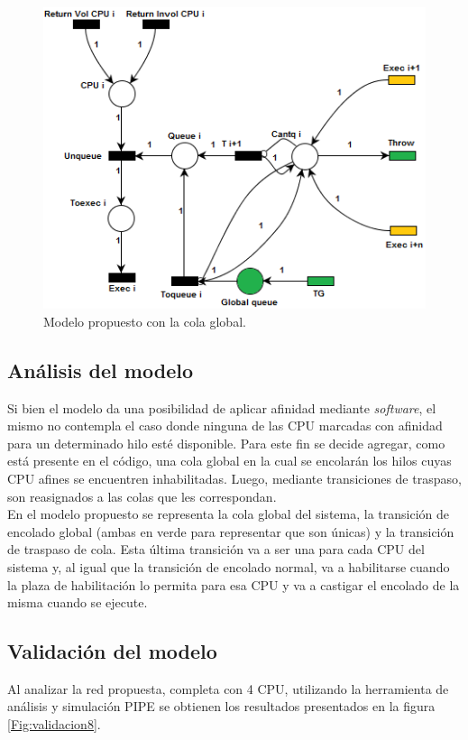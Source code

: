 \documentclass[a4paper]{book}
\begin{document}
\begin{figure} [H]
	\begin{center}
	    \includegraphics[scale=1]{./imagenes/it8modelored.png}
		\caption{Modelo propuesto con la cola global.}
	\end{center}
\end{figure}

\subsection{An\'alisis del modelo}
Si bien el modelo da una posibilidad de aplicar afinidad mediante \emph{software}, el mismo no contempla el caso donde ninguna de las CPU marcadas con afinidad para un determinado hilo est\'e disponible. Para este fin se decide agregar, como est\'a presente en el c\'odigo, una cola global en la cual se encolar\'an los hilos cuyas CPU afines se encuentren inhabilitadas. Luego, mediante transiciones de traspaso, son reasignados a las colas que les correspondan.\\

En el modelo propuesto se representa la cola global del sistema, la transici\'on de encolado global (ambas en verde para representar que son \'unicas) y la transici\'on de traspaso de cola. Esta \'ultima transici\'on va a ser una para cada CPU del sistema y, al igual que la transici\'on de encolado normal, va a habilitarse cuando la plaza de habilitaci\'on lo permita para esa CPU y va a castigar el encolado de la misma cuando se ejecute.

\subsection{Validaci\'on del modelo}
Al analizar la red propuesta, completa con 4 CPU, utilizando la herramienta de an\'alisis y simulaci\'on PIPE se obtienen los resultados presentados en la figura \ref{Fig:validacion8}.
\end{document}
